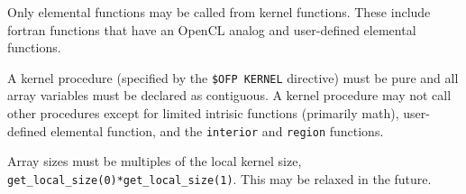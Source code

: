 Only elemental functions may be called from kernel functions.  These include
fortran functions that have an OpenCL analog and user-defined elemental functions.

A kernel procedure (specified by the {\tt \!\$OFP KERNEL} directive) must be
pure and all array variables must be declared as contiguous.  A kernel
procedure may not call other procedures except for limited intrisic
functions (primarily math), user-defined elemental function, and the
{\tt interior} and {\tt region} functions.

Array sizes must be multiples of the local kernel size, {\tt
  get\_local\_size(0)*get\_local\_size(1)}.  This may be relaxed in
the future.
